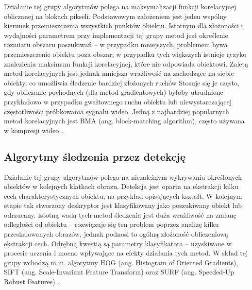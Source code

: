 Działanie tej grupy algorytmów polega na maksymalizacji funkcji korelacyjnej obliczanej na blokach pikseli.
Podstawowym założeniem jest jeden wspólny kierunek przemieszczenia wszystkich punktów obiektu.
Istotnym dla złożoności i wydajności parametrem przy implementacji tej grupy metod jest określenie rozmiaru obszaru poszukiwań -- w przypadku mniejszych, problemem bywa przemieszczenie obiektu poza obszar; w przypadku tych większych istnieje ryzyko znalezienia maksimum funkcji korelacyjnej, które nie odpowiada obiektowi. 
Zaletą metod korelacyjnych jest jednak mniejsza wrażliwość na zachodzące na siebie obiekty, co umożliwia śledzenie bardziej złożonych ruchów 
Stosuje się je często, gdy obliczanie pochodnych (dla metod gradientowych) byłoby utrudnione -- przykładowo w przypadku gwałtownego ruchu obiektu lub niewystarczającej częstotliwości próbkowania sygnału wideo. 
Jedną z najbardziej popularnych metod korelacyjnych jest BMA (ang. block-matching algorithm), często używana w kompresji wideo \cite{Aroh}. %

\subsection{Algorytmy śledzenia przez detekcję}

Działanie tej grupy algorytmów polega na niezależnym wykrywaniu określonych obiektów w kolejnych klatkach obrazu. 
Detekcja jest oparta na ekstrakcji kilku cech charakterystycznych obiektu, na przykład opisujących kształt.
W kolejnym etapie tak stworzony deskryptor jest klasyfikowany jako poszukiwany obiekt lub odrzucany. 
Istotną wadą tych metod śledzenia jest duża wrażliwość na zmianę odległości od obiektu -- rozwiązuje się ten problem poprzez analizę kilku przeskalowanych obrazów, jednak podnosi to ogólną złożoność obliczeniową ekstrakcji cech. 
Odrębną kwestią są parametry klasyfikatora -- uzyskiwane w procesie uczenia i mocno wpływające na efekty działania tych metod.
W skład tej grupy wchodzą m.in. algorytmy HOG (ang. Histogram of Oriented Gradients), SIFT (ang. Scale-Invariant Feature Transform) oraz SURF (ang. Speeded-Up Robust Features) \cite{RHOG}. %


